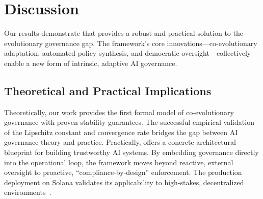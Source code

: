 \section{Discussion}\label{sec:discussion}
Our results demonstrate that \acgs{} provides a robust and practical solution to the evolutionary governance gap. The framework's core innovations---co-evolutionary adaptation, automated policy synthesis, and democratic oversight---collectively enable a new form of intrinsic, adaptive AI governance.

\subsection{Theoretical and Practical Implications}
Theoretically, our work provides the first formal model of co-evolutionary governance with proven stability guarantees. The successful empirical validation of the Lipschitz constant and convergence rate bridges the gap between AI governance theory and practice. Practically, \acgs{} offers a concrete architectural blueprint for building trustworthy AI systems. By embedding governance directly into the operational loop, the framework moves beyond reactive, external oversight to proactive, ``compliance-by-design'' enforcement. The production deployment on Solana validates its applicability to high-stakes, decentralized environments~\cite{solana2020, quantumagi2024}.

